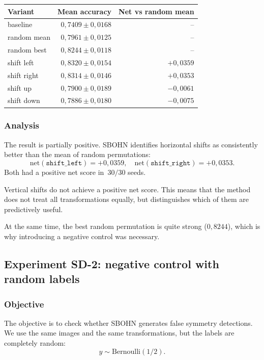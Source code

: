 \documentclass[11pt,a4paper]{report}
\begin{document}
\begin{center}
\begin{tabular}{lrr}
\toprule
Variant & Mean accuracy & Net vs random mean \\
\midrule
baseline & $0{,}7409\pm0{,}0168$ & -- \\
random mean & $0{,}7961\pm0{,}0125$ & -- \\
random best & $0{,}8244\pm0{,}0118$ & -- \\
shift left & $0{,}8320\pm0{,}0154$ & $+0{,}0359$ \\
shift right & $0{,}8314\pm0{,}0146$ & $+0{,}0353$ \\
shift up & $0{,}7900\pm0{,}0189$ & $-0{,}0061$ \\
shift down & $0{,}7886\pm0{,}0180$ & $-0{,}0075$ \\
\bottomrule
\end{tabular}
\end{center}

\subsubsection{Analysis}

The result is partially positive. SBOHN identifies horizontal shifts as consistently better than the mean of random permutations:
\[
\mathrm{net}(\texttt{shift\_left})=+0{,}0359, \quad
\mathrm{net}(\texttt{shift\_right})=+0{,}0353.
\]
Both had a positive net score in~$30/30$ seeds.

Vertical shifts do not achieve a positive net score. This means that the method does not treat all transformations equally, but distinguishes which of them are predictively useful.

At the same time, the best random permutation is quite strong ($0{,}8244$), which is why introducing a negative control was necessary.

\subsection{Experiment SD-2: negative control with random labels}

\subsubsection{Objective}

The objective is to check whether SBOHN generates false symmetry detections. We use the same images and the same transformations, but the labels are completely random:
\[
y\sim \mathrm{Bernoulli}(1/2).
\]
\end{document}
